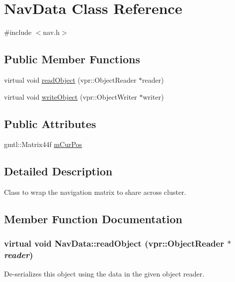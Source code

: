 \hypertarget{class_nav_data}{
\section{NavData Class Reference}
\label{class_nav_data}
}


{\ttfamily \#include $<$nav.h$>$}\subsection*{Public Member Functions}
\begin{DoxyCompactItemize}
\item 
virtual void \hyperlink{class_nav_data_a1197ced287f73897760661b891467363}{readObject} (vpr::ObjectReader $\ast$reader)
\item 
virtual void \hyperlink{class_nav_data_a1b45f76f37dccac58ecbe51b601dbfc2}{writeObject} (vpr::ObjectWriter $\ast$writer)
\end{DoxyCompactItemize}
\subsection*{Public Attributes}
\begin{DoxyCompactItemize}
\item 
gmtl::Matrix44f \hyperlink{class_nav_data_a7ca13f1fcc20a97259c3e6f9a44e758f}{mCurPos}
\end{DoxyCompactItemize}


\subsection{Detailed Description}
Class to wrap the navigation matrix to share across cluster. 

\subsection{Member Function Documentation}
\hypertarget{class_nav_data_a1197ced287f73897760661b891467363}{
\subsubsection[{readObject}]{\setlength{\rightskip}{0pt plus 5cm}virtual void NavData::readObject (vpr::ObjectReader $\ast$ {\em reader})}}
\label{class_nav_data_a1197ced287f73897760661b891467363}
De-\/serializes this object using the data in the given object reader.


